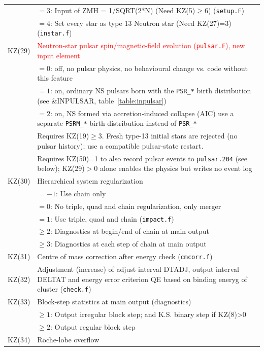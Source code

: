 \begin{longtable}{@{}p{1.5cm}p{13.0cm}}
        & $=3$: Input of ZMH = 1/SQRT(2*N) (Need KZ(5)$\ge$6) (\texttt{setup.F}) \\
        & $=4$: Set every star as type 13 Neutron star (Need KZ(27)=3) (\texttt{instar.f})  \\
KZ(29)  & \textcolor{red}{Neutron-star pulsar spin/magnetic-field evolution (\texttt{pulsar.F}), new input element} \\
        & $=0$: off, no pulsar physics, no behavioural change vs. code without this feature \\
        & $=1$: on, ordinary NS pulsars born with the \texttt{PSR\_*} birth distribution (see \&INPULSAR, table~\ref{table:inpulsar}) \\
        & $=2$: on, NS formed via accretion-induced collapse (AIC) use a separate \texttt{PSRM\_*} birth distribution instead of \texttt{PSR\_*} \\
        & Requires KZ(19)$\geq3$. Fresh type-13 initial stars are rejected (no pulsar history); use a compatible pulsar-state restart. \\
        & Requires KZ(50)=1 to also record pulsar events to \texttt{pulsar.204} (see below); KZ(29)$>$0 alone enables the physics but writes no event log \\
KZ(30)  & Hierarchical system regularization \\
        & $=-1$: Use chain only \\
        & $=0$: No triple, quad and chain regularization, only merger \\
        & $=1$: Use triple, quad and chain (\texttt{impact.f}) \\
        & $\ge 2$: Diagnostics at begin/end of chain at main output \\
        & $\ge 3$: Diagnostics at each step of chain at main output \\
KZ(31)  & Centre of mass correction after energy check (\texttt{cmcorr.f}) \\
KZ(32)  & Adjustment (increase) of adjust interval DTADJ, output interval DELTAT and energy error criterion QE based on binding eneryg of cluster (\texttt{check.f}) \\
KZ(33)  & Block-step statistics at main output (diagnostics) \\
        & $\ge 1$: Output irregular block step; and K.S. binary step if KZ(8)>0 \\
        & $\ge 2$: Output regular block step \\
KZ(34)  & Roche-lobe overflow \\

\end{longtable}
